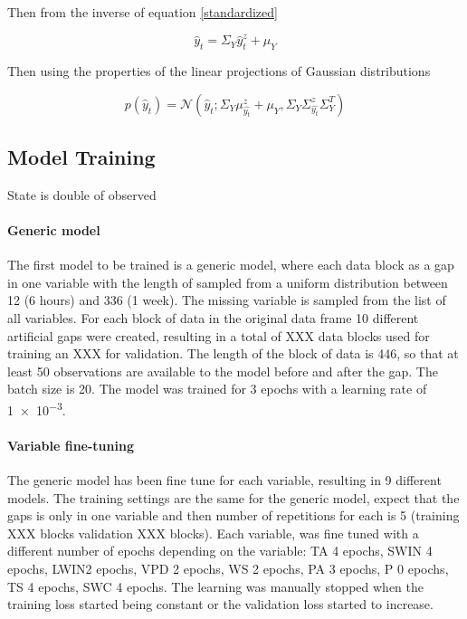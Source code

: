 \documentclass{article}
\newcommand{\norm}[3]{\mathcal{N}\left(#1; #2, #3\right)} %
\let\Oldsubsection\subsection
\renewcommand{\subsection}{\FloatBarrier\Oldsubsection}
\begin{document}
Then from the inverse of equation \ref{standardized}

\begin{equation}
    \hat{y}_t = \Sigma_Y\hat{y}^z_t + \mu_Y
\end{equation}

Then using the properties of the linear projections of Gaussian distributions

\begin{equation}
    p(\hat{y}_t) = \norm{\hat{y}_t}{\Sigma_Y\mu^z_{\hat{y_t}} + \mu_Y}{\Sigma_Y\Sigma^z_{\hat{y_t}}\Sigma_Y^T}
\end{equation}

\subsection{Model Training}

State is double of observed

\paragraph{Generic model} The first model to be trained is a generic model, where each data block as a gap in one variable with the length of sampled from a uniform distribution between \num{12} (6 hours) and \num{336} (1 week). The missing variable is sampled from the list of all variables. For each block of data in the original data frame 10 different artificial gaps were created, resulting in a total of XXX data blocks used for training an XXX for validation. 
The length of the block of data is \num{446}, so that at least \num{50} observations are available to the model before and after the gap. The batch size is \num{20}.
The model was trained for \num{3} epochs with a learning rate of \num{1e-3}.

\paragraph{Variable fine-tuning} The generic model has been fine tune for each variable, resulting in \num{9} different models. The training settings are the same for the generic model, expect that the gaps is only in one variable and then number of repetitions for each is 5 (training XXX blocks validation XXX blocks). Each variable, was fine tuned with a different number of epochs depending on the variable: TA \num{4} epochs, SW\textunderscore IN \num{4} epochs, LW\textunderscore IN\num{2} epochs, VPD \num{2} epochs, WS \num{2} epochs, PA \num{3} epochs, P \num{0} epochs, TS \num{4} epochs, SWC \num{4} epochs. The learning was manually stopped when the training loss started being constant or the validation loss started to increase.
\end{document}
